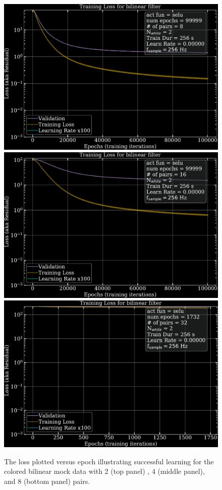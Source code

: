 \begin{refsection}
\begin{figure}[htbp]
   \centering
   \includegraphics[width=.7\columnwidth]{chapter_noise_sub/etc/loss8C}
   \includegraphics[width=.7\columnwidth]{chapter_noise_sub/etc/loss16C}
   \includegraphics[width=.7\columnwidth]{chapter_noise_sub/etc/loss32C}
   \caption{The loss plotted versus epoch illustrating successful learning for the colored bilinear mock data with 2 (top panel) , 4 (middle panel), and 8 (bottom panel) pairs.}
   \label{fig:loss2}
\end{figure}


\end{refsection}
